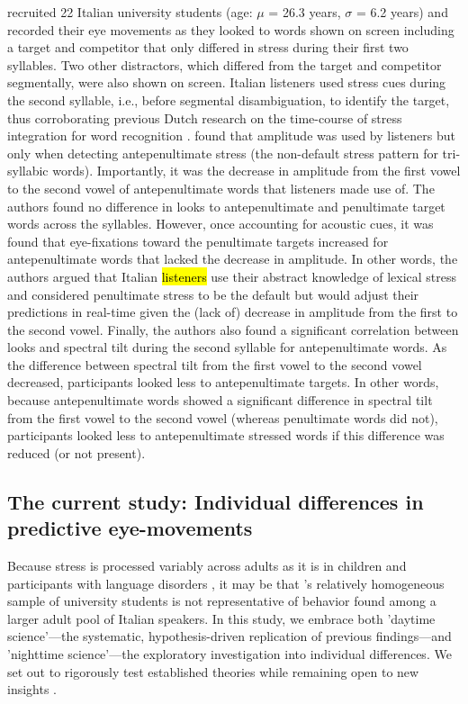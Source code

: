 \cite{Sulpizio_McQueen_2012} recruited 22 Italian university students (age: $\mu$ = 26.3 years, $\sigma$ = 6.2 years) and recorded their eye movements as they looked to words shown on screen including a target and competitor that only differed in stress during their first two syllables. Two other distractors, which differed from the target and competitor segmentally, were also shown on screen. Italian listeners used stress cues during the second syllable, i.e., before segmental disambiguation, to identify the target, thus corroborating previous Dutch research on the time-course of stress integration for word recognition \citep{Reinisch2010}. \cite{Sulpizio_McQueen_2012} found that amplitude was used by listeners but only when detecting antepenultimate stress (the non-default stress pattern for tri-syllabic words). Importantly, it was the decrease in amplitude from the first vowel to the second vowel of antepenultimate words that listeners made use of. The authors found no difference in looks to antepenultimate and penultimate target words across the syllables. However, once accounting for acoustic cues, it was found that eye-fixations toward the penultimate targets increased for antepenultimate words that lacked the decrease in amplitude. In other words, the authors argued that Italian \hl{listeners} use their abstract knowledge of lexical stress and considered penultimate stress to be the default but would adjust their predictions in real-time given the (lack of) decrease in amplitude from the first to the second vowel. Finally, the authors also found a significant correlation between looks and spectral tilt during the second syllable for antepenultimate words. As the difference between spectral tilt from the first vowel to the second vowel decreased, participants looked less to antepenultimate targets. In other words, because antepenultimate words showed a significant difference in spectral tilt from the first vowel to the second vowel (whereas penultimate words did not), participants looked less to antepenultimate stressed words if this difference was reduced (or not present). 



\subsection{The current study: Individual differences in predictive eye-movements}
Because stress is processed variably across adults as it is in children \citep[e.g.,][]{Colombo2014} and participants with language disorders \citep[e.g.,][]{Cappa1997, Liu2018}, it may be that \cite{Sulpizio_McQueen_2012}'s relatively homogeneous sample of university students is not representative of behavior found among a larger adult pool of Italian speakers. In this study, we embrace both 'daytime science'—the systematic, hypothesis-driven replication of previous findings—and 'nighttime science'—the exploratory investigation into individual differences. We set out to rigorously test established theories while remaining open to new insights \citep{Yanai2020}.

